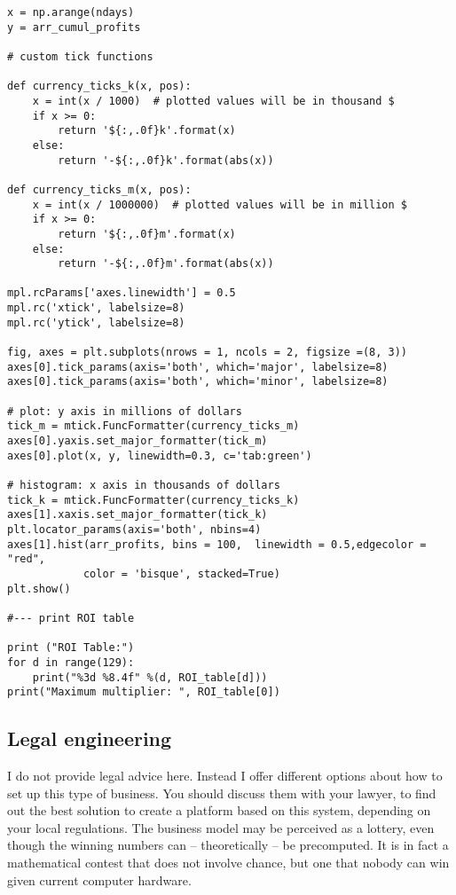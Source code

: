 \documentclass[oneside,10pt]{book}
\begin{document}
\begin{lstlisting}
x = np.arange(ndays)
y = arr_cumul_profits

# custom tick functions

def currency_ticks_k(x, pos):
    x = int(x / 1000)  # plotted values will be in thousand $
    if x >= 0:
        return '${:,.0f}k'.format(x)
    else:
        return '-${:,.0f}k'.format(abs(x))

def currency_ticks_m(x, pos):
    x = int(x / 1000000)  # plotted values will be in million $
    if x >= 0:
        return '${:,.0f}m'.format(x)
    else:
        return '-${:,.0f}m'.format(abs(x))

mpl.rcParams['axes.linewidth'] = 0.5
mpl.rc('xtick', labelsize=8)
mpl.rc('ytick', labelsize=8)

fig, axes = plt.subplots(nrows = 1, ncols = 2, figsize =(8, 3))
axes[0].tick_params(axis='both', which='major', labelsize=8)
axes[0].tick_params(axis='both', which='minor', labelsize=8)

# plot: y axis in millions of dollars
tick_m = mtick.FuncFormatter(currency_ticks_m)
axes[0].yaxis.set_major_formatter(tick_m)
axes[0].plot(x, y, linewidth=0.3, c='tab:green')

# histogram: x axis in thousands of dollars
tick_k = mtick.FuncFormatter(currency_ticks_k)
axes[1].xaxis.set_major_formatter(tick_k)
plt.locator_params(axis='both', nbins=4)
axes[1].hist(arr_profits, bins = 100,  linewidth = 0.5,edgecolor = "red",
            color = 'bisque', stacked=True)
plt.show()

#--- print ROI table

print ("ROI Table:")
for d in range(129):
    print("%3d %8.4f" %(d, ROI_table[d]))
print("Maximum multiplier: ", ROI_table[0])
\end{lstlisting}

\subsection{Legal engineering}

I do not provide legal advice here. Instead I offer different options about how to set up this type of business. You should discuss them with your lawyer, to find out the best solution to create a platform based on this system, depending on your local regulations. The business model may be perceived as a
 lottery, even though the winning numbers can -- theoretically -- be precomputed. It is in fact a mathematical contest that does not involve chance, but one that nobody can win given current computer hardware.
\end{document}
